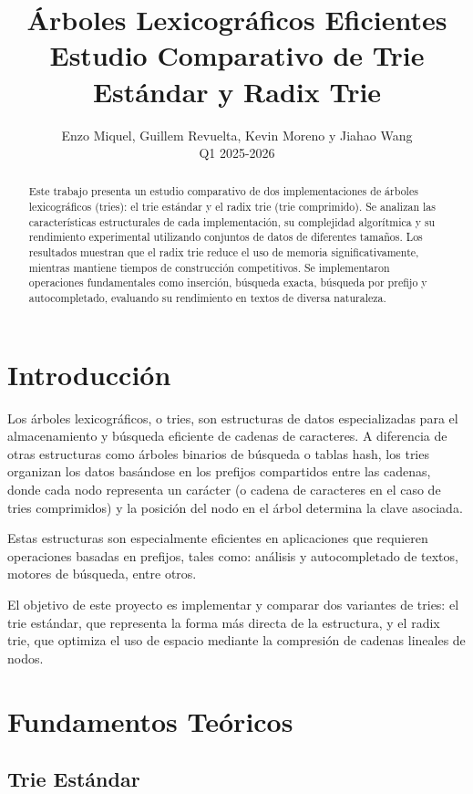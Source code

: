 \documentclass[11pt,a4paper]{article}
\title{\textbf{Árboles Lexicográficos Eficientes}\\
\large Estudio Comparativo de Trie Estándar y Radix Trie}
\author{Enzo Miquel, Guillem Revuelta, Kevin Moreno y Jiahao Wang\\
Q1 2025-2026}
\date{}
\begin{document}
\maketitle

\begin{abstract}
Este trabajo presenta un estudio comparativo de dos implementaciones de árboles lexicográficos (tries): el trie estándar y el radix trie (trie comprimido). Se analizan las características estructurales de cada implementación, su complejidad algorítmica y su rendimiento experimental utilizando conjuntos de datos de diferentes tamaños. Los resultados muestran que el radix trie reduce el uso de memoria significativamente, mientras mantiene tiempos de construcción competitivos. Se implementaron operaciones fundamentales como inserción, búsqueda exacta, búsqueda por prefijo y autocompletado, evaluando su rendimiento en textos de diversa naturaleza.
\end{abstract}

\section{Introducción}

Los árboles lexicográficos, o tries, son estructuras de datos especializadas para el almacenamiento y búsqueda eficiente de cadenas de caracteres. A diferencia de otras estructuras como árboles binarios de búsqueda o tablas hash, los tries organizan los datos basándose en los prefijos compartidos entre las cadenas, donde cada nodo representa un carácter (o cadena de caracteres en el caso de tries comprimidos) y la posición del nodo en el árbol determina la clave asociada.

Estas estructuras son especialmente eficientes en aplicaciones que requieren operaciones basadas en prefijos, tales como: análisis y autocompletado de textos, motores de búsqueda, entre otros.

El objetivo de este proyecto es implementar y comparar dos variantes de tries: el trie estándar, que representa la forma más directa de la estructura, y el radix trie, que optimiza el uso de espacio mediante la compresión de cadenas lineales de nodos.

\section{Fundamentos Teóricos}

\subsection{Trie Estándar}
\end{document}
